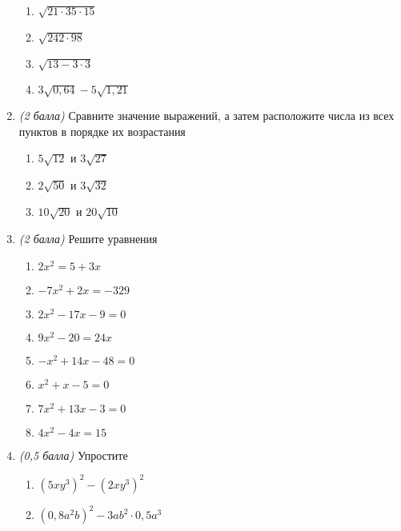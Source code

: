 \documentclass[12pt, a4paper]{article}
\begin{document}
\begin{enumerate}
\begin{multicols}{2}
\begin{enumerate}[label=\asbuk*)]
				\item $\sqrt{21 \cdot 35 \cdot 15}$
				\item $\sqrt{242 \cdot 98}$
				\item $\sqrt{13 - 3 \cdot 3}$
				\item $3 \sqrt{0,64} - 5 \sqrt{1,21}$
			\end{enumerate}
		\end{multicols}
		\item \textit{(2 балла)} Сравните значение выражений, а затем расположите числа из всех пунктов в порядке их возрастания
		\begin{multicols}{2}
		\begin{enumerate}[label=\asbuk*)]
				\item $5\sqrt {12}$ и $3\sqrt{27}$
				\item $2\sqrt{50}$ и $3\sqrt{32}$
				\item $10\sqrt{20}$ и $20\sqrt{10}$
				\end{enumerate}
		\end{multicols}
			\item \textit{(2 балла)} Решите уравнения
		\begin{multicols}{2}
			\begin{enumerate}[label=\asbuk*)]
				\item $2x^2=5+3x$
				\item $-7x^2+2x=-329$
				\item $2x^2-17x-9=0$
				\item $9x^2-20=24x$
				\item $-x^2+14x-48=0$
				\item $x^2+x-5=0$
				\item $7x^2+13x-3=0$
				\item $4x^2-4x=15$
			\end{enumerate}
		\end{multicols}
	\item \textit{(0,5 балла)} Упростите
	\begin{multicols}{2}
		\begin{enumerate}[label=\asbuk*)]
			\item $(5xy^3)^2-(2xy^3)^2$
			\item $(0,8a^2b)^2-3ab^2 \cdot 0,5a^3$
		\end{enumerate}
	\end{multicols}
	\end{enumerate}
\end{document}
